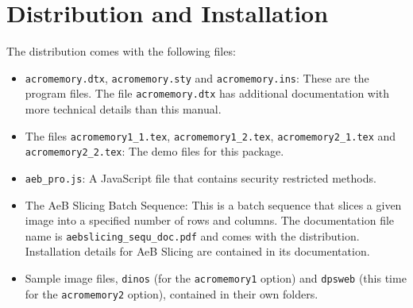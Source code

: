 \documentclass{article}
\begin{document}
\section{Distribution and Installation}\label{installation}

The distribution comes with the following files:
\begin{itemize}

    \item \texttt{acromemory.dtx}, \texttt{acromemory.sty} and \texttt{acromemory.ins}:
    These are the program files.  The file \texttt{acromemory.dtx} has additional documentation
    with more technical details than this manual.

    \item The files \texttt{acromemory1\_1.tex},
    \texttt{acromemory1\_2.tex}, \texttt{acromemory2\_1.tex} and
    \texttt{acromemory2\_2.tex}: The demo files for this package.

    \item \texttt{aeb\_pro.js}: A JavaScript file that contains
    security restricted methods.

    \item The \textsf{AeB Slicing} Batch Sequence: This is a batch
        sequence that slices a given image into a specified number of
        rows and columns. The documentation file name is
        \texttt{aebslicing\_sequ\_doc.pdf} and comes with the
        distribution. Installation details for \textsf{AeB Slicing}
        are contained in its documentation.

    \item Sample image files, \texttt{dinos} (for the
    \texttt{acromemory1} option) and \texttt{dpsweb} (this time
    for the \texttt{acromemory2} option), contained in their own folders.

\end{itemize}
\end{document}
